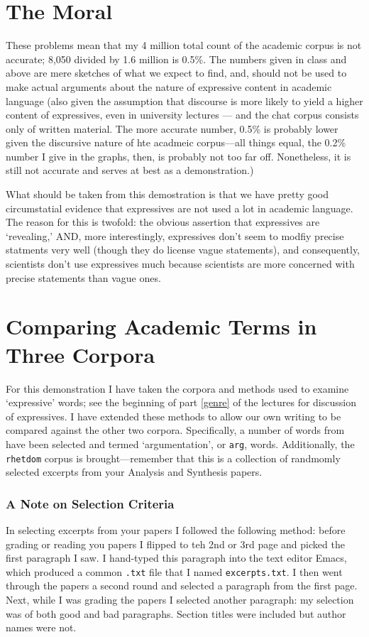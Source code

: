 \documentclass{article}
\begin{document}
\section{The Moral}\label{moral}
These problems mean that my 4 million total count of the academic corpus is not accurate; 8,050 divided by 1.6 million is 0.5\%. The numbers given in class and above are mere sketches of what we expect to find, and, should not be used to make actual arguments about the nature of expressive content in academic language (also given the assumption that discourse is more likely to yield a higher content of expressives, even in university lectures --- and the chat corpus consists only of written material. The more accurate number, 0.5\% is probably lower given the discursive nature of hte acadmeic corpus---all things equal, the 0.2\% number I give in the graphs, then, is probably not too far off. Nonetheless, it is still not accurate and serves at best as a demonstration.) 

What should be taken from this demostration is that we have pretty good circumstatial evidence that expressives are not used a lot in academic language. The reason for this is twofold: the obvious assertion that expressives are `revealing,' AND, more interestingly, expressives don't seem to modfiy precise statments very well (though they do license vague statements), and consequently, scientists don't use expressives much because scientists are more concerned with precise statements than vague ones.

\section{Comparing Academic Terms in Three Corpora}
For this demonstration I have taken the corpora and methods used to examine `expressive' words; see the beginning of part \ref{genre} of the lectures for discussion of expressives. I have extended these methods to allow our own writing to be compared against the other two corpora. Specifically, a number of words from  have been selected and termed `argumentation', or \texttt{arg}, words. Additionally, the \texttt{rhetdom} corpus is brought---remember that this is a collection of randmomly selected excerpts from your Analysis and Synthesis papers.
\subsubsection{A Note on Selection Criteria}
In selecting excerpts from your papers I followed the following method: before grading or reading you papers I flipped to teh 2nd or 3rd page and picked the first paragraph I saw. I hand-typed this paragraph into the text editor Emacs, which produced a common \texttt{.txt} file that I named \texttt{excerpts.txt}. I then went through the papers a second round and selected a paragraph from the first page. Next, while I was grading the papers I selected another paragraph: my selection was of both good and bad paragraphs. Section titles were included but author names were not.
\end{document}
